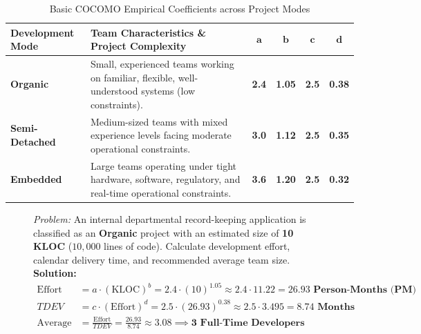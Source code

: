 \begin{table}[htbp]
\centering
\small
\caption{Basic COCOMO Empirical Coefficients across Project Modes}
\label{tab:cocomo_coefficients}
\begin{tabularx}{\textwidth}{l p{5cm} c c c c}
\toprule
\textbf{Development Mode} & \textbf{Team Characteristics \& Project Complexity} & $\mathbf{a}$ & $\mathbf{b}$ & $\mathbf{c}$ & $\mathbf{d}$ \\
\midrule
\textbf{Organic} & Small, experienced teams working on familiar, flexible, well-understood systems (low constraints). & \textbf{2.4} & \textbf{1.05} & \textbf{2.5} & \textbf{0.38} \\
\textbf{Semi-Detached} & Medium-sized teams with mixed experience levels facing moderate operational constraints. & \textbf{3.0} & \textbf{1.12} & \textbf{2.5} & \textbf{0.35} \\
\textbf{Embedded} & Large teams operating under tight hardware, software, regulatory, and real-time operational constraints. & \textbf{3.6} & \textbf{1.20} & \textbf{2.5} & \textbf{0.32} \\
\bottomrule
\end{tabularx}
\end{table}

\begin{figure}[htbp]
\centering
\begin{tcolorbox}[colback=codebg, colframe=primary, title=\textbf{Worked Example: Basic COCOMO Effort and Duration}]
\textit{Problem:} An internal departmental record-keeping application is classified as an \textbf{Organic} project with an estimated size of \textbf{10 KLOC} ($10,000$ lines of code). Calculate development effort, calendar delivery time, and recommended average team size. \\
\textbf{Solution:}
\begin{align*}
\text{Effort} &= a \cdot (\text{KLOC})^b = 2.4 \cdot (10)^{1.05} \approx 2.4 \cdot 11.22 = \mathbf{26.93\text{ Person-Months (PM)}} \\
TDEV &= c \cdot (\text{Effort})^d = 2.5 \cdot (26.93)^{0.38} \approx 2.5 \cdot 3.495 = \mathbf{8.74\text{ Months}} \\
\text{Average Staffing} &= \frac{\text{Effort}}{TDEV} = \frac{26.93}{8.74} \approx \mathbf{3.08 \implies 3\text{ Full-Time Developers}}
\end{align*}
\end{tcolorbox}
\end{figure}

